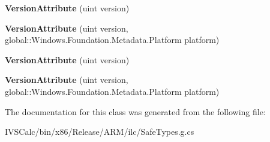 \begin{DoxyCompactItemize}
{\bfseries Version\+Attribute} (uint version)
\item 
\mbox{\label{class_windows_1_1_foundation_1_1_metadata_1_1_version_attribute_accd0294cfa9d875028c4497806f06a70}} 
{\bfseries Version\+Attribute} (uint version, global\+::\+Windows.\+Foundation.\+Metadata.\+Platform platform)
\item 
\mbox{\label{class_windows_1_1_foundation_1_1_metadata_1_1_version_attribute_a1513f2a0a2235a39907e0b41d19e4f24}} 
{\bfseries Version\+Attribute} (uint version)
\item 
\mbox{\label{class_windows_1_1_foundation_1_1_metadata_1_1_version_attribute_accd0294cfa9d875028c4497806f06a70}} 
{\bfseries Version\+Attribute} (uint version, global\+::\+Windows.\+Foundation.\+Metadata.\+Platform platform)
\end{DoxyCompactItemize}


The documentation for this class was generated from the following file\+:\begin{DoxyCompactItemize}
\item 
I\+V\+S\+Calc/bin/x86/\+Release/\+A\+R\+M/ilc/Safe\+Types.\+g.\+cs\end{DoxyCompactItemize}
